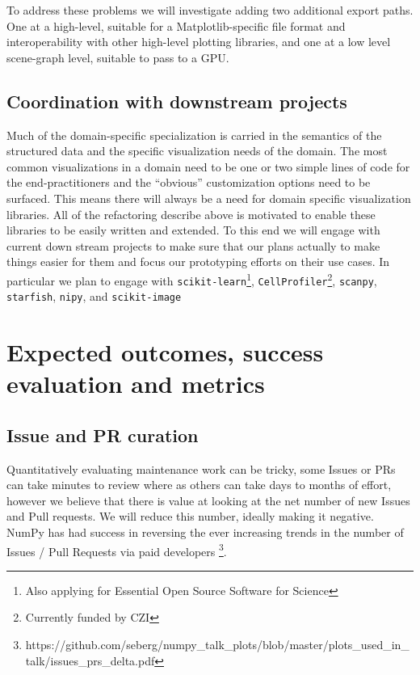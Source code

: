\documentclass[11pt]{article}  %
\begin{document}
To address these problems we will investigate adding two additional
export paths.  One at a high-level, suitable for a Matplotlib-specific
file format and interoperability with other high-level plotting
libraries, and one at a low level scene-graph level, suitable to pass
to a GPU.


\subsection{Coordination with downstream projects}

Much of the domain-specific specialization is carried in the semantics
of the structured data and the specific visualization needs of the
domain.  The most common visualizations in a domain need to be one or
two simple lines of code for the end-practitioners and the ``obvious''
customization options need to be surfaced.  This means there will
always be a need for domain specific visualization libraries.  All of
the refactoring describe above is motivated to enable these libraries
to be easily written and extended.  To this end we will engage with
current down stream projects to make sure that our plans actually to
make things easier for them and focus our prototyping efforts on their
use cases.  In particular we plan to engage with
\texttt{scikit-learn}\footnote{Also applying for Essential Open Source
Software for Science}, \texttt{CellProfiler}\footnote{Currently funded
by CZI\label{f:czi}}, \texttt{scanpy},
\texttt{starfish}, \texttt{nipy}, and
\texttt{scikit-image}


\section{Expected outcomes, success evaluation and metrics}
\subsection{Issue and PR curation}

Quantitatively evaluating maintenance work can be tricky, some Issues
or PRs can take minutes to review where as others can take days to
months of effort, however we believe that there is value at looking at
the net number of new Issues and Pull requests.  We will reduce this
number, ideally making it negative.  NumPy has had success in
reversing the ever increasing trends in the number of Issues / Pull
Requests via paid
developers \footnote{https://github.com/seberg/numpy\_talk\_plots/blob/master/plots\_used\_in\_talk/issues\_prs\_delta.pdf}.
\end{document}
